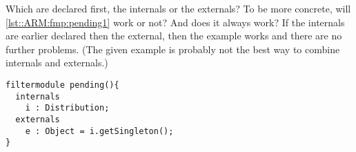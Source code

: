 Which are declared first, the internals or the externals? To be more concrete, will
\autoref{lst::ARM:fmp:pending1} work or not? And does it always work? If the internals are earlier
declared then the external, then the example works and there are no further problems. (The given
example is probably not the best way to combine internals and externals.)

\begin{lstlisting}[caption = {A filtermodule with an external from an internal},label=lst::ARM:fmp:pending1,style=listing,language=ComposeStar,float=tpb]
filtermodule pending(){
  internals
    i : Distribution;
  externals
    e : Object = i.getSingleton();
}
\end{lstlisting}